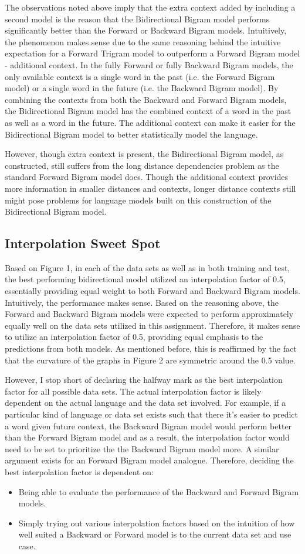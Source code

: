 \documentclass{article} %
\begin{document}
The observations noted above imply that the extra context added by including a second model is the reason that the Bidirectional Bigram model performs significantly better than the Forward or Backward Bigram models. Intuitively, the phenomenon makes sense due to the same reasoning behind the intuitive expectation for a Forward Trigram model to outperform a Forward Bigram model - additional context. In the fully Forward or fully Backward Bigram models, the only available context is a single word in the past (i.e. the Forward Bigram model) or a single word in the future (i.e. the Backward Bigram model). By combining the contexts from both the Backward and Forward Bigram models, the Bidirectional Bigram model has the combined context of a word in the past as well as a word in the future. The additional context can make it easier for the Bidirectional Bigram model to better statistically model the language.

However, though extra context is present, the Bidirectional Bigram model, as constructed, still suffers from the long distance dependencies problem as the standard Forward Bigram model does. Though the additional context provides more information in smaller distances and contexts, longer distance contexts still might pose problems for language models built on this construction of the Bidirectional Bigram model.

\subsection{Interpolation Sweet Spot}

Based on Figure 1, in each of the data sets as well as in both training and test, the best performing bidirectional model utilized an interpolation factor of 0.5, essentially providing equal weight to both Forward and Backward Bigram models. Intuitively, the performance makes sense. Based on the reasoning above, the Forward and Backward Bigram models were expected to perform approximately equally well on the data sets utilized in this assignment. Therefore, it makes sense to utilize an interpolation factor of 0.5, providing equal emphasis to the predictions from both models. As mentioned before, this is reaffirmed by the fact that the curvature of the graphs in Figure 2 are symmetric around the 0.5 value.

However, I stop short of declaring the halfway mark as the best interpolation factor for all possible data sets. The actual interpolation factor is likely dependent on the actual language and the data set involved. For example, if a particular kind of language or data set exists such that there it's easier to predict a word given future context, the Backward Bigram model would perform better than the Forward Bigram model and as a result, the interpolation factor would need to be set to prioritize the the Backward Bigram model more. A similar argument exists for an Forward Bigram model analogue. Therefore, deciding the best interpolation factor is dependent on:

\begin{itemize}
\item Being able to evaluate the performance of the Backward and Forward Bigram models.
\item Simply trying out various interpolation factors based on the intuition of how well suited a Backward or Forward model is to the current data set and use case.

\end{itemize}
\end{document}

